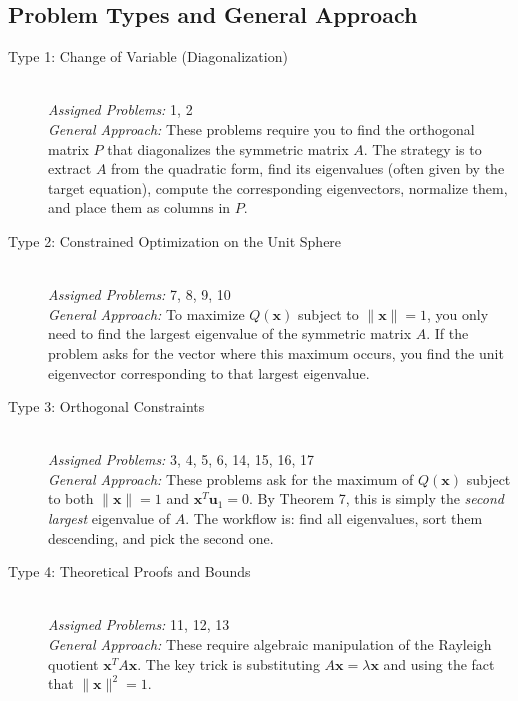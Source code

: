 \documentclass[11pt, letterpaper]{article}
\theoremstyle{definition}
\theoremstyle{remark}
\begin{document}
\subsection{Problem Types and General Approach}
\begin{description}
    \item[Type 1: Change of Variable (Diagonalization)] \hfill \\
    \textit{Assigned Problems:} 1, 2 \\
    \textit{General Approach:} These problems require you to find the orthogonal matrix $P$ that diagonalizes the symmetric matrix $A$. The strategy is to extract $A$ from the quadratic form, find its eigenvalues (often given by the target equation), compute the corresponding eigenvectors, normalize them, and place them as columns in $P$.
    
    \item[Type 2: Constrained Optimization on the Unit Sphere] \hfill \\
    \textit{Assigned Problems:} 7, 8, 9, 10 \\
    \textit{General Approach:} To maximize $Q(\mathbf{x})$ subject to $\|\mathbf{x}\| = 1$, you only need to find the largest eigenvalue of the symmetric matrix $A$. If the problem asks for the vector where this maximum occurs, you find the unit eigenvector corresponding to that largest eigenvalue.
    
    \item[Type 3: Orthogonal Constraints] \hfill \\
    \textit{Assigned Problems:} 3, 4, 5, 6, 14, 15, 16, 17 \\
    \textit{General Approach:} These problems ask for the maximum of $Q(\mathbf{x})$ subject to both $\|\mathbf{x}\| = 1$ and $\mathbf{x}^T\mathbf{u}_1 = 0$. By Theorem 7, this is simply the \textit{second largest} eigenvalue of $A$. The workflow is: find all eigenvalues, sort them descending, and pick the second one.
    
    \item[Type 4: Theoretical Proofs and Bounds] \hfill \\
    \textit{Assigned Problems:} 11, 12, 13 \\
    \textit{General Approach:} These require algebraic manipulation of the Rayleigh quotient $\mathbf{x}^T A \mathbf{x}$. The key trick is substituting $A\mathbf{x} = \lambda\mathbf{x}$ and using the fact that $\|\mathbf{x}\|^2 = 1$.
\end{description}
\end{document}
